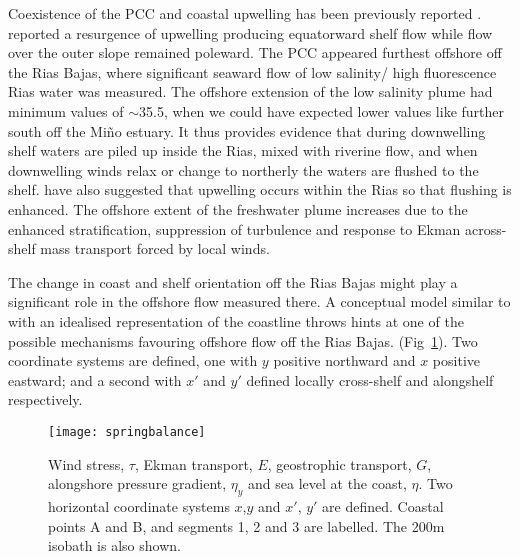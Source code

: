 Coexistence of the PCC and coastal upwelling has been previously
reported \citep{Castro97,Peliz02}. \citet{Haynes90} reported a
resurgence of upwelling producing equatorward shelf flow while
flow over the outer slope remained poleward. The PCC appeared
furthest offshore off the Rias Bajas, where significant seaward
flow of low salinity/ high fluorescence Rias water was measured.
The offshore extension of the low salinity plume had minimum
values of $\sim$35.5, when we could have expected lower values
like further south off the Mi\~{n}o estuary. It thus provides
evidence that during downwelling shelf waters are piled up inside
the Rias, mixed with riverine flow, and when downwelling winds
relax or change to northerly the waters are flushed to the shelf.
\citet{Alvarez-Salgado00} have also suggested that upwelling
occurs within the Rias so that flushing is enhanced. The offshore
extent of the freshwater plume increases due to the enhanced
stratification, suppression of turbulence and response to Ekman
across-shelf mass transport forced by local winds.

The change in coast and shelf orientation off the Rias Bajas might
play a significant role in the offshore flow measured there. A
conceptual model similar to \citet{Rosenfeld94} with an idealised
representation of the coastline throws hints at one of the
possible mechanisms favouring offshore flow off the Rias Bajas.
(Fig~\ref{fig:cd105_model}). Two coordinate systems are defined,
one with $y$ positive northward and $x$ positive eastward; and a
second with $x'$ and $y'$ defined locally cross-shelf and
alongshelf respectively.


\begin{figure}[!t]
\centering
\texttt{[image: springbalance]}
\caption{Wind stress, $\tau$, Ekman transport, $E$, geostrophic
transport, $G$, alongshore pressure gradient, ${\eta}_y$ and sea
level at the coast, $\eta$. Two horizontal coordinate systems
$x$,$y$ and $x'$, $y'$ are defined. Coastal points A and B, and
segments 1, 2 and 3 are labelled. The 200m isobath is also shown.}
\label{fig:cd105_model}\end{figure}

